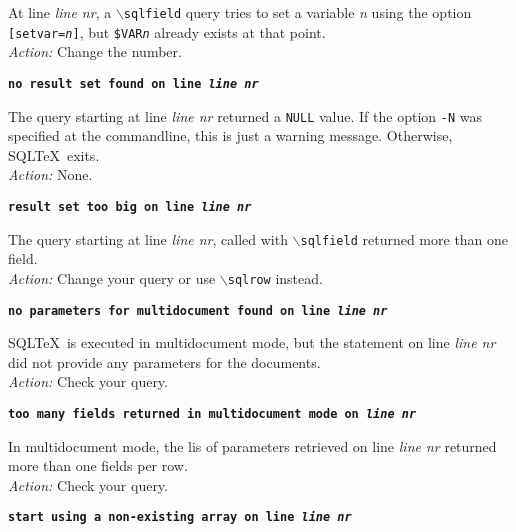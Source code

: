 \documentclass{article}
\newcommand{\bs}{\ensuremath{\backslash}}
\newcommand{\vs}{\vspace{3mm}}
\begin{document}
\noindent At line \textit{line nr}, a \texttt{\bs sqlfield} query tries to set a variable \textit{n}
using the option \texttt{[setvar=\textit{n}]}, but \texttt{\$VAR\textit{n}} already
exists at that point. \\
\textit{Action:} Change the number.

\vs

\noindent\textbf{\texttt{no result set found on line \textit{line nr}}}

\vspace{1mm}

\noindent The query starting at line \textit{line nr} returned a \texttt{NULL} value. If the
option \texttt{-N} was specified at the commandline, this is just a warning message.
Otherwise, SQL\TeX\ exits. \\
\textit{Action:} None.

\vs

\noindent\textbf{\texttt{result set too big on line \textit{line nr}}}

\vspace{1mm}

\noindent The query starting at line \textit{line nr}, called with \texttt{\bs sqlfield} returned more than one field. \\
\textit{Action:} Change your query or use \texttt{\bs sqlrow} instead.

\vs

\noindent\textbf{\texttt{no parameters for multidocument found on line \textit{line nr}}}

\vspace{1mm}

\noindent SQL\TeX\ is executed in multidocument mode, but the statement on line
\textit{line nr} did not provide any parameters for the documents. \\
\textit{Action:} Check your query.

\vs

\noindent\textbf{\texttt{too many fields returned in multidocument mode on \textit{line nr}}}

\vspace{1mm}

\noindent In multidocument mode, the lis of parameters retrieved on line
\textit{line nr} returned more than one fields per row. \\
\textit{Action:} Check your query.

\vs

\noindent\textbf{\texttt{start using a non-existing array on line \textit{line nr}}}
\end{document}

